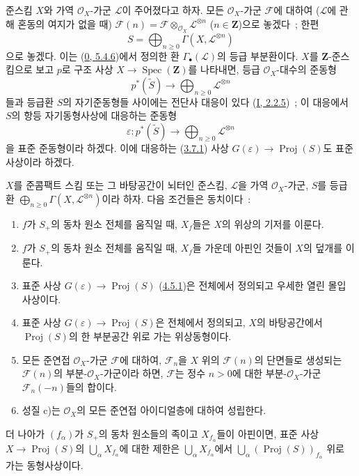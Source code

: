 \begin{env}[4.5.1]
\label{II.4.5.1-ko}
준스킴 $X$와 가역 $\mathcal{O}_X$-가군 $\mathcal{L}$이 주어졌다고
하자. 모든 $\mathcal{O}_X$-가군 $\mathcal{F}$에 대하여
($\mathcal{L}$에 관해 혼동의 여지가 없을 때)
$\mathcal{F}(n)=\mathcal{F}\otimes_{\mathcal{O}_X}\mathcal{L}^{\otimes n}$
($n\in\mathbf{Z}$)으로 놓겠다~; 한편
\[
  S=\bigoplus_{n\geq0}\Gamma(X,\mathcal{L}^{\otimes n})
\]
으로 놓겠다. 이는 (\hyperref[0.5.4.6-ko]{0, 5.4.6})에서 정의한 환
$\Gamma_\bullet(\mathcal{L})$의 등급 부분환이다. $X$를
$\mathbf{Z}$-준스킴으로 보고 $p$로 구조 사상
$X\to\operatorname{Spec}(\mathbf{Z})$를 나타내면, 등급
$\mathcal{O}_X$-대수의 준동형
\[
  p^*(\widetilde{S})\longrightarrow
  \bigoplus_{n\geq0}\mathcal{L}^{\otimes n}
\]
들과 등급환 $S$의 자기준동형들 사이에는 전단사 대응이 있다
(\hyperref[I.2.2.5-ko]{I, 2.2.5})~; 이 대응에서 $S$의 항등
자기동형사상에 대응하는 준동형
\[
  \varepsilon:p^*(\widetilde{S})\longrightarrow
  \bigoplus_{n\geq0}\mathcal{L}^{\otimes n}
\]
을 표준 준동형이라 하겠다. 이에 대응하는
(\hyperref[II.3.7.1-ko]{3.7.1}) 사상
$G(\varepsilon)\to\operatorname{Proj}(S)$도 표준 사상이라 하겠다.
\end{env}

\begin{theorem}[4.5.2]
\label{II.4.5.2-ko}
$X$를 준콤팩트 스킴 또는 그 바탕공간이 뇌터인 준스킴,
$\mathcal{L}$을 가역 $\mathcal{O}_X$-가군, $S$를 등급환
$\bigoplus_{n\geq0}\Gamma(X,\mathcal{L}^{\otimes n})$이라 하자. 다음
조건들은 동치이다~:
\begin{enumerate}
  \item[\rm{a)}] $f$가 $S_+$의 동차 원소 전체를 움직일 때,
  $X_f$들은 $X$의 위상의 기저를 이룬다.
  \item[\rm{a')}] $f$가 $S_+$의 동차 원소 전체를 움직일 때,
  $X_f$들 가운데 아핀인 것들이 $X$의 덮개를 이룬다.
  \item[\rm{b)}] 표준 사상
  $G(\varepsilon)\to\operatorname{Proj}(S)$
  (\hyperref[II.4.5.1-ko]{4.5.1})은 전체에서 정의되고 우세한 열린 몰입
  사상이다.


  \item[\rm{b')}] 표준 사상
  $G(\varepsilon)\to\operatorname{Proj}(S)$은 전체에서 정의되고,
  $X$의 바탕공간에서 $\operatorname{Proj}(S)$의 한 부분공간 위로 가는
  위상동형이다.
  \item[\rm{c)}] 모든 준연접 $\mathcal{O}_X$-가군 $\mathcal{F}$에
  대하여, $\mathcal{F}_n$을 $X$ 위의 $\mathcal{F}(n)$의 단면들로
  생성되는 $\mathcal{F}(n)$의 부분-$\mathcal{O}_X$-가군이라 하면,
  $\mathcal{F}$는 정수 $n>0$에 대한 부분-$\mathcal{O}_X$-가군
  $\mathcal{F}_n(-n)$들의 합이다.
  \item[\rm{c')}] 성질 c)는 $\mathcal{O}_X$의 모든 준연접 아이디얼층에
  대하여 성립한다.
\end{enumerate}
더 나아가 $(f_\alpha)$가 $S_+$의 동차 원소들의 족이고
$X_{f_\alpha}$들이 아핀이면, 표준 사상
$X\to\operatorname{Proj}(S)$의 $\bigcup_\alpha X_{f_\alpha}$에 대한
제한은 $\bigcup_\alpha X_{f_\alpha}$에서
$\bigcup_\alpha(\operatorname{Proj}(S))_{f_\alpha}$ 위로 가는
동형사상이다.
\end{theorem}


